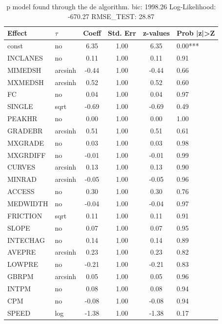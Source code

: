 \begin{table}
	\caption{p model found through the de algorithm. bic: 1998.26 Log-Likelihood: -670.27 RMSE_TEST: 28.87}
	\begin{center}
		\begin{tabular}{|l|l|c|c|c|l|}
			\hline
			Effect & $\tau$ & Coeff & Std. Err & z-values & Prob |z|>Z \\
			\hline
			const & no & 6.35 & 1.00 & 6.35 & 0.00*** \\
			\hline
			INCLANES & no & 0.11 & 1.00 & 0.11 & 0.91 \\
			\hline
			MIMEDSH & arcsinh & -0.44 & 1.00 & -0.44 & 0.66 \\
			\hline
			MXMEDSH & arcsinh & 0.52 & 1.00 & 0.52 & 0.60 \\
			\hline
			FC & no & 0.04 & 1.00 & 0.04 & 0.97 \\
			\hline
			SINGLE & sqrt & -0.69 & 1.00 & -0.69 & 0.49 \\
			\hline
			PEAKHR & no & 0.00 & 1.00 & 0.00 & 1.00 \\
			\hline
			GRADEBR & arcsinh & 0.51 & 1.00 & 0.51 & 0.61 \\
			\hline
			MXGRADE & no & 0.03 & 1.00 & 0.03 & 0.98 \\
			\hline
			MXGRDIFF & no & -0.01 & 1.00 & -0.01 & 0.99 \\
			\hline
			CURVES & arcsinh & 0.13 & 1.00 & 0.13 & 0.90 \\
			\hline
			MINRAD & arcsinh & -0.05 & 1.00 & -0.05 & 0.96 \\
			\hline
			ACCESS & no & 0.30 & 1.00 & 0.30 & 0.76 \\
			\hline
			MEDWIDTH & no & -0.04 & 1.00 & -0.04 & 0.97 \\
			\hline
			FRICTION & sqrt & 0.11 & 1.00 & 0.11 & 0.91 \\
			\hline
			SLOPE & no & 0.07 & 1.00 & 0.07 & 0.95 \\
			\hline
			INTECHAG & no & 0.14 & 1.00 & 0.14 & 0.89 \\
			\hline
			AVEPRE & arcsinh & 0.23 & 1.00 & 0.23 & 0.82 \\
			\hline
			LOWPRE & no & -0.21 & 1.00 & -0.21 & 0.83 \\
			\hline
			GBRPM & arcsinh & 0.05 & 1.00 & 0.05 & 0.96 \\
			\hline
			INTPM & no & 0.08 & 1.00 & 0.08 & 0.94 \\
			\hline
			CPM & no & -0.08 & 1.00 & -0.08 & 0.94 \\
			\hline
			SPEED & log & -1.38 & 1.00 & -1.38 & 0.17 \\

\end{tabular}
\end{center}
\end{table}
